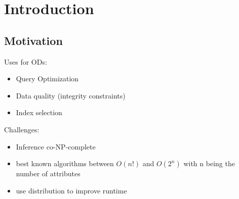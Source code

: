 
\section{Introduction}\label{sec:intro}

   \subsection{Motivation}	
	
	Uses for ODs:
   \begin{itemize}
		\item Query Optimization
		\item Data quality (integrity constraints)
		\item Index selection
	\end{itemize}
	
	Challenges:
	\begin{itemize}
		\item Inference co-NP-complete \citep{ginsburg}
		\item best known algorithms between $O(n!)$ \citep{consonni} and $O(2^n)$ \citep{szlichta:discovery} with n being the number of attributes 
		\item use distribution to improve runtime 
	\end{itemize}		  
  